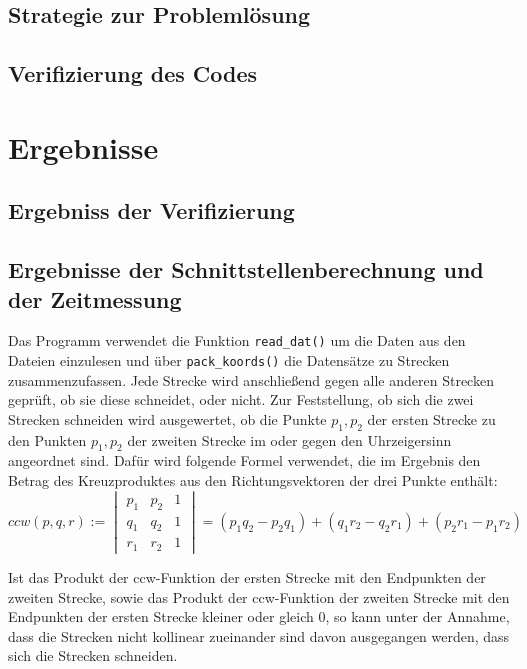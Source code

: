 \documentclass[12pt]{scrartcl}
\newcommand{\code}[1]{\texttt{#1}}
\begin{document}
\subsection{Strategie zur Problemlösung}

\subsection{Verifizierung des Codes}

\section{Ergebnisse}

\subsection{Ergebniss der Verifizierung}

\subsection{Ergebnisse der Schnittstellenberechnung und der Zeitmessung}

Das Programm verwendet die Funktion \code{read\_dat()} um die Daten aus den Dateien einzulesen und über \code{pack\_koords()} die Datensätze zu Strecken zusammenzufassen.
Jede Strecke wird anschließend gegen alle anderen Strecken geprüft, ob sie diese schneidet, oder nicht.
Zur Feststellung, ob sich die zwei Strecken schneiden wird ausgewertet, ob die Punkte $p_1, p_2$ der ersten Strecke zu den Punkten $p_1, p_2$ der zweiten Strecke im oder gegen den Uhrzeigersinn angeordnet sind.
Dafür wird folgende Formel verwendet, die im Ergebnis den Betrag des Kreuzproduktes aus den Richtungsvektoren der drei Punkte enthält:
\begin{equation}
    ccw(p, q, r) := \begin{vmatrix} p_1 & p_2 & 1 \\ q_1 & q_2 & 1 \\ r_1 & r_2 & 1 \end{vmatrix} = (p_1q_2 - p_2q_1) + (q_1r_2 - q_2r_1) + (p_2r_1 - p_1r_2)
\end{equation}

Ist das Produkt der ccw-Funktion der ersten Strecke mit den Endpunkten der zweiten Strecke, sowie das Produkt der ccw-Funktion der zweiten Strecke mit den Endpunkten der ersten Strecke kleiner oder gleich 0, so kann unter der Annahme, dass die Strecken nicht kollinear zueinander sind davon ausgegangen werden, dass sich die Strecken schneiden.
\end{document}
